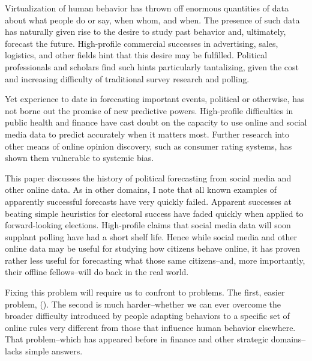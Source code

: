 \documentclass{article}
\begin{document}
Virtualization of human behavior has thrown off enormous quantities of
data about what people do or say, when whom, and when. The presence of
such data has naturally given rise to the desire to study past behavior and,
ultimately, forecast the future. High-profile commercial successes in
advertising, sales, logistics, and other fields hint that this desire
may be fulfilled. Political professionals and scholars find such hints
particularly tantalizing, given the cost and increasing difficulty of
traditional survey research and polling. 

Yet experience to date in forecasting important events, political or
otherwise, has not borne out the promise of new predictive
powers. High-profile difficulties in public health and finance have
cast doubt on the capacity to use online and social media data to
predict accurately when it matters most. Further research into other
means of online opinion discovery, such as consumer rating systems,
has shown them vulnerable to systemic bias. 

This paper discusses the history of political forecasting from social
media and other online data. As in other domains, I note that all
known examples of apparently successful forecasts have very quickly
failed. Apparent successes at beating simple heuristics for electoral
success have faded quickly when applied to forward-looking
elections. High-profile claims that social media data will soon
supplant polling have had a short shelf life. Hence while social media
and other online data may be useful for studying how citizens behave
online, it has proven rather less useful for forecasting what those
same citizens--and, more importantly, their offline fellows--will do
back in the real world.


Fixing this problem will require us to confront to problems. The
first, easier problem, (). The second is much harder--whether we can
ever overcome the broader difficulty introduced by people adapting
behaviors to a specific set of online rules very different from those
that influence human behavior elsewhere. That problem--which has
appeared before in finance and other strategic domains--lacks simple
answers. %
\end{document}
